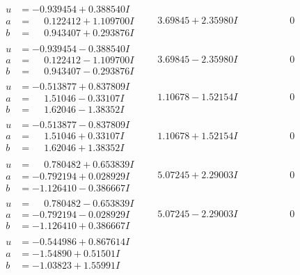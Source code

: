 \documentclass[1p]{elsarticle_modified}
\theoremstyle{definition}
\begin{document}
$$\begin{array}{c|c|c}
\begin{aligned}
u &= -0.939454 + 0.388540 I \\
a &= \phantom{-}0.122412 + 1.109700 I \\
b &= \phantom{-}0.943407 + 0.293876 I\end{aligned}
 & \phantom{-}3.69845 + 2.35980 I & \phantom{-0.000000 } 0 \\ \hline\begin{aligned}
u &= -0.939454 - 0.388540 I \\
a &= \phantom{-}0.122412 - 1.109700 I \\
b &= \phantom{-}0.943407 - 0.293876 I\end{aligned}
 & \phantom{-}3.69845 - 2.35980 I & \phantom{-0.000000 } 0 \\ \hline\begin{aligned}
u &= -0.513877 + 0.837809 I \\
a &= \phantom{-}1.51046 - 0.33107 I \\
b &= \phantom{-}1.62046 - 1.38352 I\end{aligned}
 & \phantom{-}1.10678 - 1.52154 I & \phantom{-0.000000 } 0 \\ \hline\begin{aligned}
u &= -0.513877 - 0.837809 I \\
a &= \phantom{-}1.51046 + 0.33107 I \\
b &= \phantom{-}1.62046 + 1.38352 I\end{aligned}
 & \phantom{-}1.10678 + 1.52154 I & \phantom{-0.000000 } 0 \\ \hline\begin{aligned}
u &= \phantom{-}0.780482 + 0.653839 I \\
a &= -0.792194 + 0.028929 I \\
b &= -1.126410 - 0.386667 I\end{aligned}
 & \phantom{-}5.07245 + 2.29003 I & \phantom{-0.000000 } 0 \\ \hline\begin{aligned}
u &= \phantom{-}0.780482 - 0.653839 I \\
a &= -0.792194 - 0.028929 I \\
b &= -1.126410 + 0.386667 I\end{aligned}
 & \phantom{-}5.07245 - 2.29003 I & \phantom{-0.000000 } 0 \\ \hline\begin{aligned}
u &= -0.544986 + 0.867614 I \\
a &= -1.54890 + 0.51501 I \\
b &= -1.03823 + 1.55991 I\end{aligned}

\end{array}$$
\end{document}
